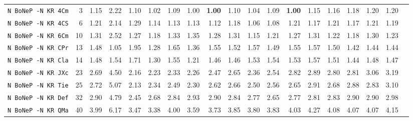 \begin{tabular}{l | r @{~~} r | r@{~~}r@{~~}r@{~~}r@{~~}r@{~~}r@{~~}r@{~~}r@{~~}r@{~~}r@{~~}r@{~~}r@{~~}r@{~~}r@{~~}r@{~~}r|}
\verb+N BoNeP -N KR 4Cm+ & 3 & 1.15 & 2.22&1.10&1.02&1.09&1.00&\textbf{1.00}&1.10&1.04&1.09&\textbf{1.00}&1.15&1.16&1.18&1.20&1.20\\
\verb+N BoNeP -N KR 4CS+ & 6 & 1.21 & 2.14&1.29&1.14&1.13&1.13&1.12&1.18&1.06&1.08&1.21&1.17&1.21&1.17&1.21&1.19\\
\verb+N BoNeP -N KR 6Cm+ & 10 & 1.31 & 2.52&1.27&1.18&1.33&1.35&1.28&1.31&1.15&1.21&1.27&1.31&1.22&1.18&1.30&1.23\\
\verb+N BoNeP -N KR CPr+ & 13 & 1.48 & 1.05&1.95&1.28&1.65&1.36&1.55&1.52&1.57&1.49&1.55&1.57&1.50&1.42&1.44&1.44\\
\verb+N BoNeP -N KR Cla+ & 14 & 1.48 & 1.54&1.71&1.30&1.55&1.21&1.46&1.46&1.53&1.54&1.53&1.57&1.51&1.44&1.48&1.47\\
\verb+N BoNeP -N KR JXc+ & 23 & 2.69 & 4.50&2.16&2.23&2.33&2.26&2.47&2.65&2.36&2.54&2.82&2.89&2.80&2.81&3.06&3.19\\
\verb+N BoNeP -N KR Tie+ & 25 & 2.72 & 5.07&2.13&2.34&2.49&2.30&2.62&2.66&2.50&2.56&2.65&2.91&2.68&2.88&2.83&3.10\\
\verb+N BoNeP -N KR Def+ & 32 & 2.90 & 4.79&2.45&2.68&2.84&2.93&2.90&2.84&2.77&2.65&2.77&2.81&2.83&2.90&2.90&2.98\\
\verb+N BoNeP -N KR QMa+ & 40 & 3.99 & 6.17&3.47&3.38&4.00&3.59&3.73&3.85&3.80&3.83&4.03&4.27&4.08&4.07&4.07&4.15\\
\end{tabular}
